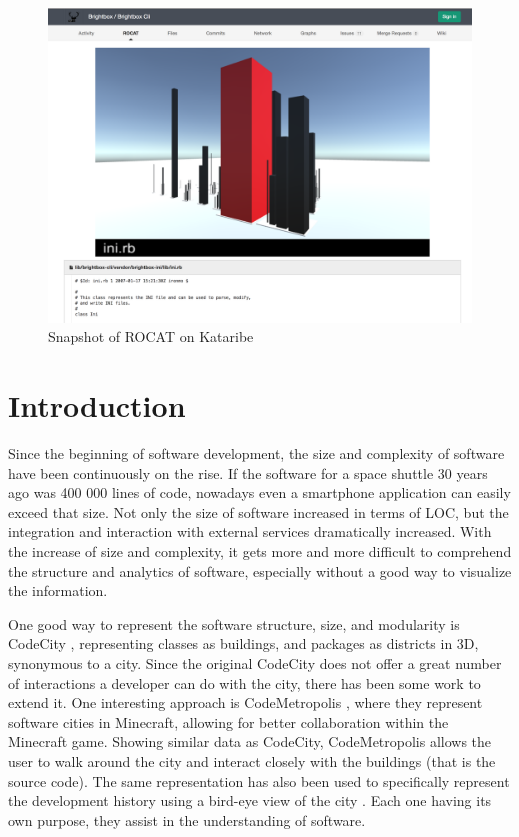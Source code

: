\documentclass[conference]{IEEEtran}
\begin{document}
\begin{figure}[t!]
\centering
\includegraphics[bb=0 0 1218 905, width=18cm]{rocat-on-kataribe.png}
\caption{Snapshot of ROCAT on Kataribe}
\label{figure:rocat-on-kataribe}
\end{figure}

\section{Introduction}
Since the beginning of software development, the size and complexity of software have been continuously on the rise.
If the software for a space shuttle 30 years ago was 400 000 lines of code, nowadays even a smartphone application can easily exceed that size.
Not only the size of software increased in terms of LOC, but the integration and interaction with external services dramatically increased.
With the increase of size and complexity, it gets more and more difficult to comprehend the structure and analytics of software, especially without a good way to visualize the information.

One good way to represent the software structure, size, and modularity is CodeCity \cite{Wettel:2011:SSC:1985793.1985868}, representing classes as buildings, and packages as districts in 3D, synonymous to a city.
Since the original CodeCity does not offer a great number of interactions a developer can do with the city, there has been some work to extend it.
One interesting approach is CodeMetropolis \cite{6648194}, where they represent software cities in Minecraft, allowing for better collaboration within the Minecraft game.
Showing similar data as CodeCity, CodeMetropolis allows the user to walk around the city and interact closely with the buildings (that is the source code).
The same representation has also been used to specifically represent the development history using a bird-eye view of the city \cite{Steinbruckner:2010:RDH:1879211.1879239}.
Each one having its own purpose, they assist in the understanding of software.
\end{document}
